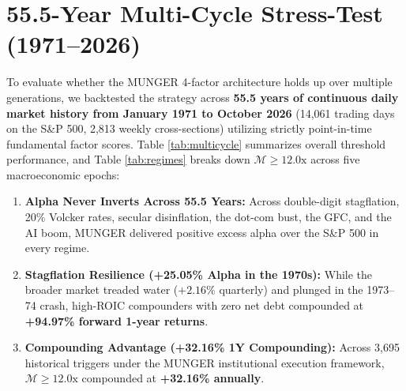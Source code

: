 \documentclass[10pt,twocolumn]{article}
\begin{document}
\section{55.5-Year Multi-Cycle Stress-Test (1971--2026)}
To evaluate whether the MUNGER 4-factor architecture holds up over multiple generations, we backtested the strategy across \textbf{55.5 years of continuous daily market history from January 1971 to October 2026} (14,061 trading days on the S\&P 500, 2,813 weekly cross-sections) utilizing strictly point-in-time fundamental factor scores. Table \ref{tab:multicycle} summarizes overall threshold performance, and Table \ref{tab:regimes} breaks down $\mathcal{M} \ge 12.0\text{x}$ across five macroeconomic epochs:
\begin{enumerate}
    \item \textbf{Alpha Never Inverts Across 55.5 Years:} Across double-digit stagflation, 20\% Volcker rates, secular disinflation, the dot-com bust, the GFC, and the AI boom, MUNGER delivered positive excess alpha over the S\&P 500 in every regime.
    \item \textbf{Stagflation Resilience (+25.05\% Alpha in the 1970s):} While the broader market treaded water ($+2.16\%$ quarterly) and plunged in the 1973--74 crash, high-ROIC compounders with zero net debt compounded at \textbf{+94.97\% forward 1-year returns}.
    \item \textbf{Compounding Advantage (+32.16\% 1Y Compounding):} Across 3,695 historical triggers under the MUNGER institutional execution framework, $\mathcal{M} \ge 12.0\text{x}$ compounded at \textbf{+32.16\% annually}.
\end{enumerate}
\end{document}
